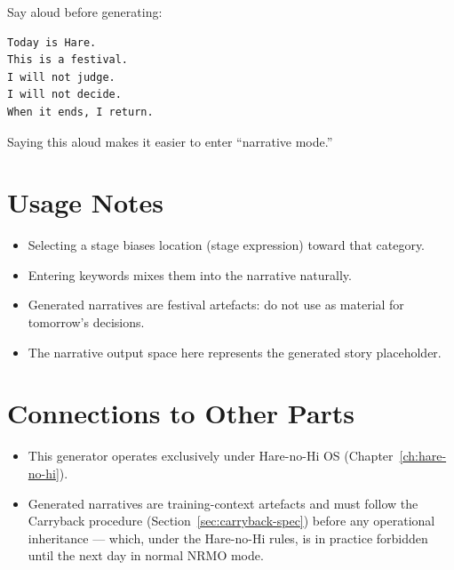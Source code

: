 Say aloud before generating:

\begin{lstlisting}[basicstyle=\ttfamily\small,frame=single]
Today is Hare.
This is a festival.
I will not judge.
I will not decide.
When it ends, I return.
\end{lstlisting}

\noindent
Saying this aloud makes it easier to enter ``narrative mode.''

\section{Usage Notes}
\label{sec:narrative-usage}

\begin{itemize}
\item Selecting a stage biases location (stage expression) toward
that category.
\item Entering keywords mixes them into the narrative naturally.
\item Generated narratives are festival artefacts: do not use as
material for tomorrow's decisions.
\item The narrative output space here represents the generated story
placeholder.
\end{itemize}

\section*{Connections to Other Parts}

\begin{itemize}
\item This generator operates exclusively under Hare-no-Hi OS
(Chapter~\ref{ch:hare-no-hi}).
\item Generated narratives are training-context artefacts and must
follow the Carryback procedure
(Section~\ref{sec:carryback-spec}) before any operational
inheritance --- which, under the Hare-no-Hi rules, is in practice
forbidden until the next day in normal NRMO mode.
\end{itemize}
